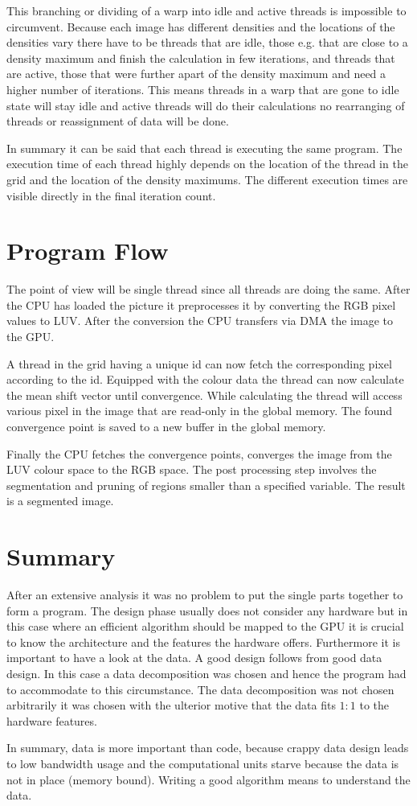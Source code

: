 This branching or dividing of a warp into idle and active threads is impossible
to circumvent. Because each image has different densities and the locations
of the densities vary there have to be threads that are idle, those e.g. that
are close to a density maximum and finish the calculation in few iterations,
and threads that are active, those that were further apart of the density maximum
and need a higher number of iterations. This means threads in a warp that
are gone to idle state will stay idle and active threads will do their 
calculations no rearranging of threads or reassignment of data will be done. 

In summary it can be said that each thread is executing the same program. The 
execution time of each thread highly depends on the location of the thread in
the grid and the location of the density maximums. The different execution times
are visible directly in the final iteration count. 

\section{Program Flow} %
\label{sec:program_flow}

The point of view will be single thread since all threads are doing the same. 
After the \gls{CPU} has loaded the picture it preprocesses it by converting
the \gls{RGB} pixel values to \gls{LUV}. After the conversion the \gls{CPU}
transfers via \gls{DMA} the image to the \gls{GPU}.

A thread in the grid having a unique id can now fetch the corresponding pixel
according to the id. Equipped with the colour data the thread can now calculate
the mean shift vector until convergence. While calculating the thread will 
access various pixel in the image that are read-only in the global memory. The 
found convergence point is saved to a new buffer in the global memory.

Finally the \gls{CPU} fetches the convergence points, converges the image from 
the \gls{LUV} colour space to the \gls{RGB} space. The post processing step
involves the segmentation and pruning of regions smaller than a specified 
variable. The result is a segmented image. 


\section{Summary} %
\label{sec:design_summary}
After an extensive analysis it was no problem to put the single parts together
to form a program. The design phase usually does not consider any hardware but
in this case where an efficient algorithm should be mapped to the \gls{GPU} it
is crucial to know the architecture and the features the hardware offers. 
Furthermore it is important to have a look at the data. A good design follows
from good data design. In this case a data decomposition was chosen and hence the 
program had to accommodate to this circumstance. The data decomposition was not 
chosen arbitrarily it was chosen with the ulterior motive that the data fits
$1:1$ to the hardware features. 

In summary, data is more important than code, because crappy data design leads
to low bandwidth usage and the computational units starve because the data
is not in place (memory bound). Writing a good algorithm means to understand the 
data. 




